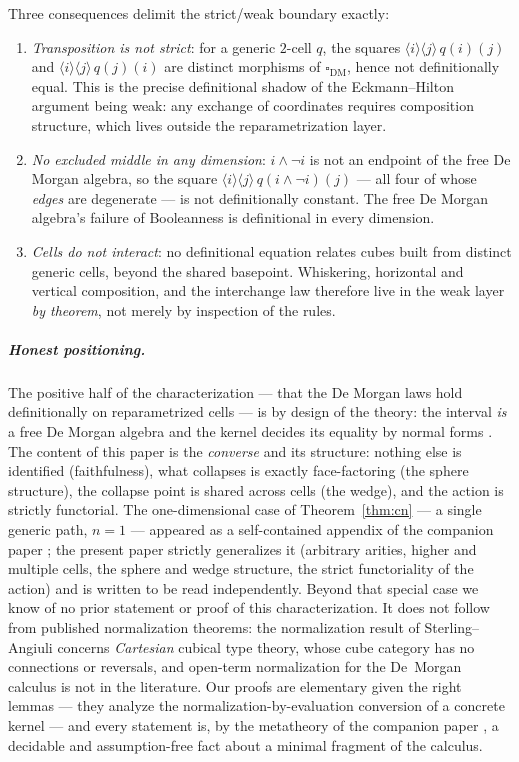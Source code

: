 \documentclass[11pt]{amsart}
\theoremstyle{definition}
\newcommand{\Dbox}{\square_{\mathrm{DM}}}
\begin{document}
Three consequences delimit the strict/weak boundary exactly:
\begin{enumerate}
\item \emph{Transposition is not strict}: for a generic $2$-cell
  $q$, the squares $\langle i \rangle \langle j \rangle\,q(i)(j)$
  and $\langle i \rangle \langle j \rangle\,q(j)(i)$ are distinct
  morphisms of $\Dbox$, hence not definitionally equal.  This is the
  precise definitional shadow of the Eckmann--Hilton argument being
  weak: any exchange of coordinates requires composition structure,
  which lives outside the reparametrization layer.
\item \emph{No excluded middle in any dimension}: $i \wedge \neg i$
  is not an endpoint of the free De Morgan algebra, so the square
  $\langle i \rangle \langle j \rangle\, q(i \wedge \neg i)(j)$ ---
  all four of whose \emph{edges} are degenerate --- is not
  definitionally constant.  The free De Morgan algebra's failure of
  Booleanness is definitional in every dimension.
\item \emph{Cells do not interact}: no definitional equation relates
  cubes built from distinct generic cells, beyond the shared
  basepoint.  Whiskering, horizontal and vertical composition, and
  the interchange law therefore live in the weak layer \emph{by
  theorem}, not merely by inspection of the rules.
\end{enumerate}

\subparagraph*{Honest positioning.}  The positive half of the
characterization --- that the De Morgan laws hold definitionally on
reparametrized cells --- is by design of the theory: the interval
\emph{is} a free De Morgan algebra and the kernel decides its
equality by normal forms \cite{CCHM}.  The content of this paper is
the \emph{converse} and its structure: nothing else is identified
(faithfulness), what collapses is exactly face-factoring
(the sphere structure), the collapse point is shared across cells
(the wedge), and the action is strictly functorial.  The
one-dimensional case of Theorem~\ref{thm:cn} --- a single generic
path, $n = 1$ --- appeared as a self-contained appendix of the
companion paper \cite{Companion}; the present paper strictly
generalizes it (arbitrary arities, higher and multiple cells, the
sphere and wedge structure, the strict functoriality of the action)
and is written to be read independently.  Beyond that special case
we know of no prior statement or proof of this characterization.  It does not
follow from published normalization theorems: the normalization
result of Sterling--Angiuli \cite{SterlingAngiuli} concerns
\emph{Cartesian} cubical type theory, whose cube category has no
connections or reversals, and open-term normalization for the
De~Morgan calculus is not in the literature.  Our proofs are
elementary given the right lemmas --- they analyze the
normalization-by-evaluation conversion of a concrete kernel --- and
every statement is, by the metatheory of the companion paper
\cite{Companion}, a decidable and assumption-free fact about a
minimal fragment of the calculus.
\end{document}
